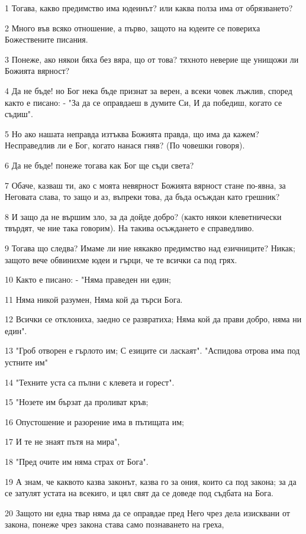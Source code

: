 \par 1 Тогава, какво предимство има юдеинът? или каква полза има от обрязването?
\par 2 Много във всяко отношение, а първо, защото на юдеите се повериха Божествените писания.
\par 3 Понеже, ако някои бяха без вяра, що от това? тяхното неверие ще унищожи ли Божията вярност?
\par 4 Да не бъде! но Бог нека бъде признат за верен, а всеки човек лъжлив, според както е писано: - "За да се оправдаеш в думите Си, И да победиш, когато се съдиш".
\par 5 Но ако нашата неправда изтъква Божията правда, що има да кажем? Несправедлив ли е Бог, когато нанася гняв? (По човешки говоря).
\par 6 Да не бъде! понеже тогава как Бог ще съди света?
\par 7 Обаче, казваш ти, ако с моята невярност Божията вярност стане по-явна, за Неговата слава, то защо и аз, въпреки това, да бъда осъждан като грешник?
\par 8 И защо да не вършим зло, за да дойде добро? (както някои клеветнически твърдят, че ние така говорим). На такива осъждането е справедливо.
\par 9 Тогава що следва? Имаме ли ние някакво предимство над езичниците? Никак; защото вече обвинихме юдеи и гърци, че те всички са под грях.
\par 10 Както е писано: - "Няма праведен ни един;
\par 11 Няма никой разумен, Няма кой да търси Бога.
\par 12 Всички се отклониха, заедно се развратиха; Няма кой да прави добро, няма ни един".
\par 13 "Гроб отворен е гърлото им; С езиците си ласкаят". "Аспидова отрова има под устните им"
\par 14 "Техните уста са пълни с клевета и горест".
\par 15 "Нозете им бързат да проливат кръв;
\par 16 Опустошение и разорение има в пътищата им;
\par 17 И те не знаят пътя на мира",
\par 18 "Пред очите им няма страх от Бога".
\par 19 А знам, че каквото казва законът, казва го за ония, които са под закона; за да се затулят устата на всекиго, и цял свят да се доведе под съдбата на Бога.
\par 20 Защото ни една твар няма да се оправдае пред Него чрез дела изисквани от закона, понеже чрез закона става само познаването на греха,
